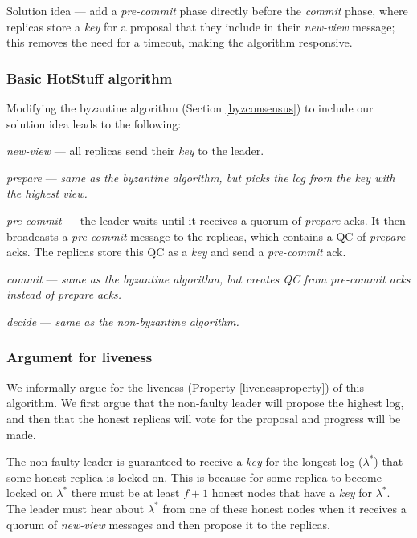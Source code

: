 Solution idea --- add a \textit{pre-commit} phase directly before the \textit{commit} phase, where replicas store a \textit{key} for a proposal that they include in their \textit{new-view} message; this removes the need for a timeout, making the algorithm responsive.

\subsubsection{Basic HotStuff algorithm}

Modifying the byzantine algorithm (Section \ref{byzconsensus}) to include our solution idea leads to the following:

\begin{description}
	\item \textit{new-view} --- all replicas send their \textit{key} to the leader.
	\item \textit{prepare} ---  \textit{same as the byzantine algorithm, but picks the log from the key with the highest view.}
	\item \textit{pre-commit} --- the leader waits until it receives a quorum of \textit{prepare} acks. It then broadcasts a \textit{pre-commit} message to the replicas, which contains a QC of \textit{prepare} acks. The replicas store this QC as a \textit{key} and send a \textit{pre-commit} ack.
	\item \textit{commit} --- \textit{same as the byzantine algorithm, but creates QC from pre-commit acks instead of prepare acks.}
	\item \textit{decide} --- \textit{same as the non-byzantine algorithm.}
\end{description}

\subsubsection{Argument for liveness} \label{livenessargument}
We informally argue for the liveness (Property \ref{livenessproperty}) of this algorithm. We first argue that the non-faulty leader will propose the highest log, and then that the honest replicas will vote for the proposal and progress will be made.

The non-faulty leader is guaranteed to receive a \textit{key} for the longest log ($\lambda^*$) that some honest replica is locked on. This is because for some replica to become locked on $\lambda^*$ there must be at least $f + 1$ honest nodes that have a \textit{key} for $\lambda^*$. The leader must hear about $\lambda^*$ from one of these honest nodes when it receives a quorum of \textit{new-view} messages and then propose it to the replicas.

